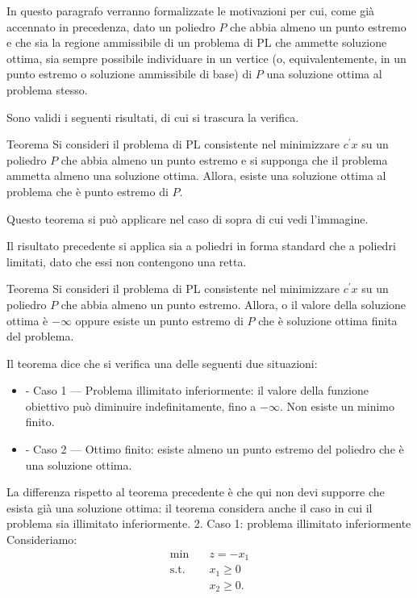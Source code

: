 In questo paragrafo verranno formalizzate le motivazioni per cui, come già accennato in precedenza, dato un poliedro $P$ che abbia almeno un punto estremo e che sia la regione ammissibile di un problema di PL che ammette soluzione ottima, sia sempre possibile individuare in un vertice (o, equivalentemente, in un punto estremo o soluzione ammissibile di base) di $P$ una soluzione ottima al problema stesso.

Sono validi i seguenti risultati, di cui si trascura la verifica.

\begin{theorem}{Teorema}
Si consideri il problema di PL consistente nel minimizzare $c^{\prime}x$ su un poliedro $P$ che abbia almeno un punto estremo e si supponga che il problema ammetta almeno una soluzione ottima. Allora, esiste una soluzione ottima al problema che è punto estremo di $P$.
\end{theorem}

Questo teorema si può applicare nel caso di sopra di cui vedi l'immagine.

Il risultato precedente si applica sia a poliedri in forma standard che a poliedri limitati, dato che essi non contengono una retta.


\begin{theorem}{Teorema}
Si consideri il problema di PL consistente nel minimizzare $c^{\prime}x$ su un poliedro $P$ che abbia almeno un punto estremo. Allora, o il valore della soluzione ottima è $-\infty$ oppure esiste un punto estremo di $P$ che è soluzione ottima finita del problema.
\end{theorem}

Il teorema dice che si verifica una delle seguenti due situazioni:
\begin{itemize}
    \item - Caso 1 — Problema illimitato inferiormente: il valore della funzione obiettivo può diminuire indefinitamente, fino a \(-\infty\). Non esiste un minimo finito.
    \item - Caso 2 — Ottimo finito: esiste almeno un punto estremo del poliedro che è una soluzione ottima.
\end{itemize}
La differenza rispetto al teorema precedente è che qui non devi supporre che esista già una soluzione ottima: il teorema considera anche il caso in cui il problema sia illimitato inferiormente.
2. Caso 1: problema illimitato inferiormente
Consideriamo:
\[
\begin{aligned}
\min \quad & z=-x_1\\
\text{s.t.}\quad & x_1\geq 0\\
&x_2\geq 0.
\end{aligned}
\]

